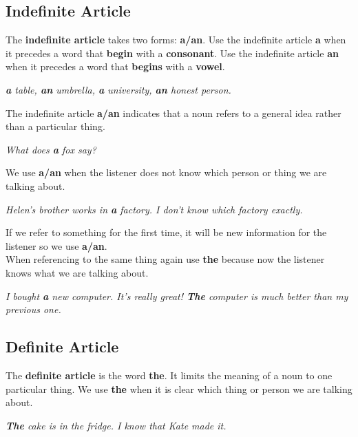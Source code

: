 \documentclass[hidelinks,10pt,a4paper]{article}
\begin{document}
\subsection{Indefinite Article}
The \textbf{indefinite article} takes two forms: \textbf{a/an}. Use the indefinite article \textbf{a} when it precedes a word that \textbf{begin} with a \textbf{consonant}. Use the indefinite article \textbf{an} when it precedes a word that \textbf{begins} with a \textbf{vowel}.
\begin{center}
		\textit{ \textbf{a} table, \textbf{an} umbrella, \textbf{a} university, \textbf{an} honest person.}
\end{center}
The indefinite article \textbf{a/an} indicates that a noun refers to a general idea rather than a particular thing.
\begin{center}
\textit{What does \textbf{a} fox say?}
\end{center}
We use \textbf{a/an} when the listener does not know which person or thing we are talking about.
\begin{center}
		\textit{Helen's brother works in \textbf{a} factory. I don't know which factory exactly.}
\end{center}
If we refer to something for the first time, it will be new information for the listener so we use \textbf{a/an}.\\
When referencing to the same thing again use \textbf{the} because now the listener knows what we are talking about.
\begin{center}
\textit{I bought \textbf{a} new computer. It's really great! \textbf{The} computer is much better than my previous one.}
\end{center}

\subsection{Definite Article}
The \textbf{definite article} is the word \textbf{the}. It limits the meaning of a noun to one particular thing. We use \textbf{the} when it is clear which thing or person we are talking about.
\begin{center}
\textit{ \textbf{The} cake is in the fridge. I know that Kate made it.}
\end{center}
\end{document}
